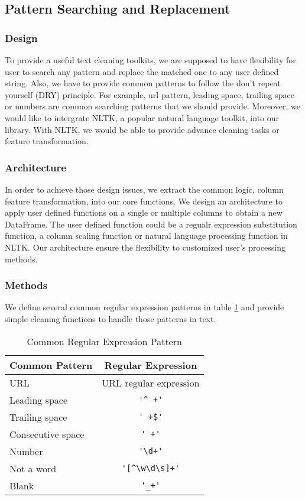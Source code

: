 \documentclass[sigconf]{acmart}
\begin{document}
\subsection{Pattern Searching and Replacement}
\subsubsection{Design} 
To provide a useful text cleaning toolkits, we are supposed to have flexibility for user to search any pattern and replace the matched one to any user defined string. Also, we have to provide common patterns to follow the don't repeat yourself (DRY) principle. For example, url pattern, leading space, trailing space or numbers are common searching patterns that we should provide. Moreover, we would like to intergrate NLTK\cite{nltk}, a popular natural language toolkit, into our library. With NLTK, we would be able to provide advance cleaning tasks or feature transformation.

\subsubsection{Architecture}
In order to achieve those design issues, we extract the common logic, column feature transformation, into our core functions. We design an architecture to apply user defined functions on a single or multiple columns to obtain a new DataFrame. The user defined function could be a regualr expression substitution function, a column scaling function or natural language processing function in NLTK. Our architecture ensure the flexibility to customized user's processing methods.

\subsubsection{Methods}
We define several common regular expression patterns in table \ref{tab:reg} and provide simple cleaning functions to handle those patterns in text.
\begin{table}
\caption{Common Regular Expression Pattern}   
\label{tab:reg}
\begin{tabular}{lc}
	Common Pattern & Regular Expression \\
\hline
	URL & URL regular expression\cite{url} \\
	Leading space & \verb!'^ +'! \\
	Trailing space & \verb!' +$'! \\
	Consecutive space & \verb!' +'! \\
	Number & \verb!'\d+'!  \\
	Not a word & \verb!'[^\w\d\s]+'! \\
	Blank & \verb!'_+'!
\end{tabular}   
\end{table}
\end{document}
